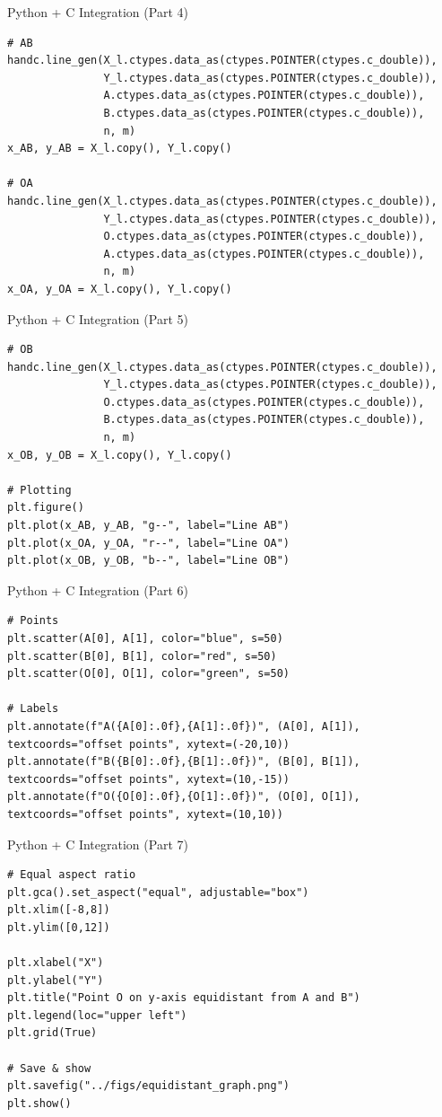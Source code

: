 \documentclass{beamer}
\begin{document}
\begin{frame}[fragile]{Python + C Integration (Part 4)}
\begin{lstlisting}
# AB
handc.line_gen(X_l.ctypes.data_as(ctypes.POINTER(ctypes.c_double)),
               Y_l.ctypes.data_as(ctypes.POINTER(ctypes.c_double)),
               A.ctypes.data_as(ctypes.POINTER(ctypes.c_double)),
               B.ctypes.data_as(ctypes.POINTER(ctypes.c_double)),
               n, m)
x_AB, y_AB = X_l.copy(), Y_l.copy()

# OA
handc.line_gen(X_l.ctypes.data_as(ctypes.POINTER(ctypes.c_double)),
               Y_l.ctypes.data_as(ctypes.POINTER(ctypes.c_double)),
               O.ctypes.data_as(ctypes.POINTER(ctypes.c_double)),
               A.ctypes.data_as(ctypes.POINTER(ctypes.c_double)),
               n, m)
x_OA, y_OA = X_l.copy(), Y_l.copy()
\end{lstlisting}
\end{frame}

\begin{frame}[fragile]{Python + C Integration (Part 5)}
\begin{lstlisting}
# OB
handc.line_gen(X_l.ctypes.data_as(ctypes.POINTER(ctypes.c_double)),
               Y_l.ctypes.data_as(ctypes.POINTER(ctypes.c_double)),
               O.ctypes.data_as(ctypes.POINTER(ctypes.c_double)),
               B.ctypes.data_as(ctypes.POINTER(ctypes.c_double)),
               n, m)
x_OB, y_OB = X_l.copy(), Y_l.copy()

# Plotting
plt.figure()
plt.plot(x_AB, y_AB, "g--", label="Line AB")
plt.plot(x_OA, y_OA, "r--", label="Line OA")
plt.plot(x_OB, y_OB, "b--", label="Line OB")
\end{lstlisting}
\end{frame}

\begin{frame}[fragile]{Python + C Integration (Part 6)}
\begin{lstlisting}
# Points
plt.scatter(A[0], A[1], color="blue", s=50)
plt.scatter(B[0], B[1], color="red", s=50)
plt.scatter(O[0], O[1], color="green", s=50)

# Labels
plt.annotate(f"A({A[0]:.0f},{A[1]:.0f})", (A[0], A[1]), textcoords="offset points", xytext=(-20,10))
plt.annotate(f"B({B[0]:.0f},{B[1]:.0f})", (B[0], B[1]), textcoords="offset points", xytext=(10,-15))
plt.annotate(f"O({O[0]:.0f},{O[1]:.0f})", (O[0], O[1]), textcoords="offset points", xytext=(10,10))
\end{lstlisting}
\end{frame}

\begin{frame}[fragile]{Python + C Integration (Part 7)}
\begin{lstlisting}
# Equal aspect ratio
plt.gca().set_aspect("equal", adjustable="box")
plt.xlim([-8,8])
plt.ylim([0,12])

plt.xlabel("X")
plt.ylabel("Y")
plt.title("Point O on y-axis equidistant from A and B")
plt.legend(loc="upper left")
plt.grid(True)

# Save & show
plt.savefig("../figs/equidistant_graph.png")
plt.show()
\end{lstlisting}
\end{frame}
\end{document}
